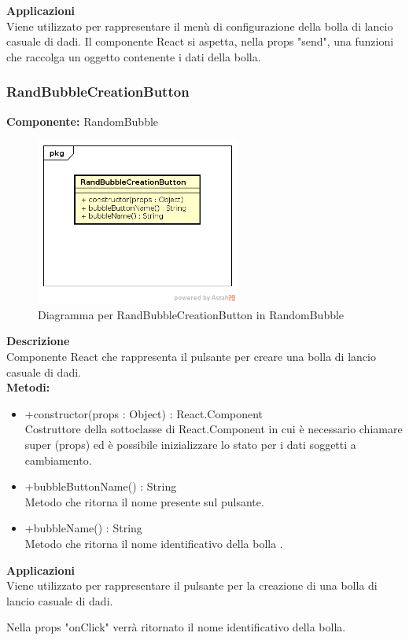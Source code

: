 \textbf{Applicazioni}\\
Viene utilizzato per rappresentare il menù di configurazione della bolla di lancio casuale di dadi. Il componente React si aspetta, nella props "send", una funzioni che raccolga un oggetto contenente i dati della bolla. 


\clearpage

\subsubsection{RandBubbleCreationButton}
\textbf{Componente:}  RandomBubble\\
   \FloatBarrier
   \begin{figure}[ht]
   \centering
   \includegraphics[width=0.6\textwidth]{img/single-RandBubbleCreationButton.png}
   \caption{{Diagramma per RandBubbleCreationButton in RandomBubble}}
\end{figure}
\FloatBarrier
\textbf{Descrizione}\\
Componente React che rappresenta il pulsante per creare una bolla di lancio casuale di dadi.
\\
\textbf{Metodi:} 
\begin{itemize}
\item +constructor(props : Object) : React.Component 
\\
Costruttore della sottoclasse di React.Component in cui è necessario chiamare super (props) ed è possibile inizializzare lo stato per i dati soggetti a cambiamento.

\item +bubbleButtonName() : String 
\\
Metodo che ritorna il nome presente sul pulsante.

\item +bubbleName() : String 
\\
Metodo che ritorna il nome identificativo della bolla .

\end{itemize} 


\textbf{Applicazioni}\\
Viene utilizzato per rappresentare il pulsante per la creazione di una bolla di lancio casuale di dadi.

Nella props "onClick" verrà ritornato il nome identificativo della bolla. 


